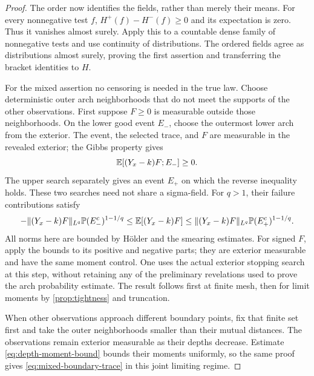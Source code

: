 \begin{proof}
The order now identifies the fields, rather than merely their means.
For every nonnegative test $f$,
$H^+(f)-H^-(f)\ge0$ and its expectation is zero. Thus it vanishes
almost surely. Apply this to a countable dense family of nonnegative
tests and use continuity of distributions. The ordered fields agree
as distributions almost surely, proving the first assertion and
transferring the bracket identities to $H$.

For the mixed assertion no censoring is needed in the true law.
Choose deterministic outer arch neighborhoods that do not meet the
supports of the other observations. First suppose $F\ge0$ is
measurable outside those neighborhoods. On the lower good event
$E_-$, choose the outermost lower arch from the exterior. The event,
the selected trace, and $F$ are measurable in the revealed exterior;
the Gibbs property gives
\[
                  \mathbb E[(Y_x-k)F;E_-]\ge0.
\]
The upper search separately gives an event $E_+$ on which the reverse
inequality holds. These two searches need not share a sigma-field.
For $q>1$, their failure contributions satisfy
\begin{equation}
 -\lVert(Y_x-k)F\rVert_{L^q}\mathbb P(E_-^c)^{1-1/q}
 \le \mathbb E[(Y_x-k)F]
 \le \lVert(Y_x-k)F\rVert_{L^q}\mathbb P(E_+^c)^{1-1/q}.
 \label{eq:weighted-arch-bounds}
\end{equation}
All norms here are bounded by H\"older and the smearing estimates.
For signed $F$, apply the bounds to its positive and negative parts;
they are exterior measurable and have the same moment control.
One uses the actual exterior stopping search at this step, without
retaining any of the preliminary revelations used to prove the arch
probability estimate. The result follows first at finite mesh, then
for limit moments by \cref{prop:tightness} and truncation.

When other observations approach different boundary points, fix that
finite set first and take the outer neighborhoods smaller than their
mutual distances. The observations remain exterior measurable as
their depths decrease. Estimate \eqref{eq:depth-moment-bound} bounds
their moments uniformly, so the same proof gives
\eqref{eq:mixed-boundary-trace} in this joint limiting regime.
\end{proof}

